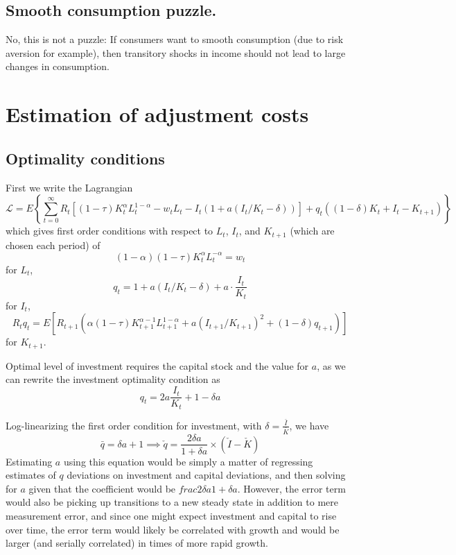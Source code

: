 \documentclass[11pt]{amsart}
\begin{document}
\subsection{Smooth consumption puzzle.}
No, this is not a puzzle: If consumers want to smooth consumption (due to risk aversion for example), then transitory shocks in income should not lead to large changes in consumption.

\section{Estimation of adjustment costs}

\subsection{Optimality conditions}

First we write the Lagrangian
\[
\mathcal{L} = E \left\{ \sum_{t=0}^{\infty} R_t \left[(1 - \tau) K_t^{\alpha} L_t^{1-\alpha} - w_t L_t - I_t \left(1 + a(I_t / K_t - \delta) \right) \right] + q_t ((1-\delta) K_t + I_t - K_{t+1}) \right\}
\]
which gives first order conditions with respect to $L_t$, $I_t$, and $K_{t+1}$ (which are chosen each period) of
\[
(1-\alpha)(1 - \tau) K_t^{\alpha} L_t^{-\alpha} = w_t
\]
for $L_t$,
\[
q_t = 1 + a(I_t / K_t - \delta) + a \cdot \frac{I_t}{K_t}
\]
for $I_t$,
\[
R_t q_t = E \left[ R_{t+1} (\alpha (1-\tau) K_{t+1}^{\alpha-1} L_{t+1}^{1-\alpha} + a(I_{t+1} / K_{t+1})^2 + (1-\delta) q_{t+1} )\right]
\]
for $K_{t+1}$.

Optimal level of investment requires the capital stock and the value for $a$, as we can rewrite the investment optimality condition as
\[
q_t = 2a \frac{I_t}{K_t} + 1 - \delta a
\]


Log-linearizing the first order condition for investment, with $\delta = \frac{\bar{I}}{\bar{K}}$, we have
\[
\bar{q} = \delta a + 1 \implies \check{q} = \frac{2 \delta a}{1 + \delta a} \times (\check{I} - \check{K})
\]
Estimating $a$ using this equation would be simply a matter of regressing estimates of $q$ deviations on investment and capital deviations, and then solving for $a$ given that the coefficient would be $frac{2 \delta a}{1 + \delta a}$. However, the error term would also be picking up transitions to a new steady state in addition to mere measurement error, and since one might expect investment and capital to rise over time, the error term would likely be correlated with growth and would be larger (and serially correlated) in times of more rapid growth.
\end{document}
